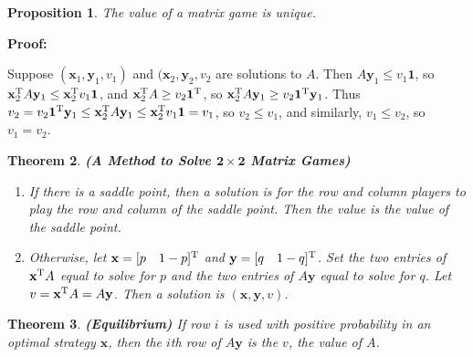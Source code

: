 \documentclass{article}
\theoremstyle{colontheorem}
\newtheorem{theorem}{Theorem}[section]
\newtheorem{proposition}[theorem]{Proposition}
\newcommand{\T}{^\textnormal{T}}
\newenvironment{Theorem}
{
	\begin{mdframed}[backgroundcolor=TheoremOrange!10]
	\begin{theorem}
}
{
	\end{theorem}
	\end{mdframed}
	
	\vspace{.15in}
}
\newenvironment{Proposition}
{
	\begin{mdframed}[backgroundcolor=TheoremOrange!10]
	\begin{proposition}
}
{
	\end{proposition}
	\end{mdframed}
	
	\vspace{.15in}
}
\newenvironment{Proof}
{
	\vspace{-.3in}
	
	\begin{mdframed}[backgroundcolor=ProofPurple!10]
	\textbf{Proof:}%
}
{
	\end{mdframed}
	
	\vspace{.15in}
}
\begin{document}
\begin{Proposition}
	
	The value of a matrix game is unique.
	
\end{Proposition}



\begin{Proof}
	Suppose $(\mathbf{x}_1, \mathbf{y}_1, v_1)$ and $(\mathbf{x}_2, \mathbf{y}_2, v_2$ are solutions to $A$. Then $A \mathbf{y}_1 \leq v_1 \mathbf{1}$, so $\mathbf{x}_2\T A \mathbf{y}_1 \leq \mathbf{x}_2\T v_1 \mathbf{1}$, and $\mathbf{x}_2\T A \geq v_2 \mathbf{1}\T$, so $\mathbf{x}_2\T A \mathbf{y}_1 \geq v_2 \mathbf{1}\T \mathbf{y}_1$. Thus $v_2 = v_2 \mathbf{1}\T \mathbf{y}_1 \leq \mathbf{x}_2\T A \mathbf{y}_1 \leq \mathbf{x}_2\T v_1 \mathbf{1} = v_1$, so $v_2 \leq v_1$, and similarly, $v_1 \leq v_2$, so $v_1 = v_2$.
	
\end{Proof}



\begin{Theorem}
	
	\textbf{(A Method to Solve $\mathbf{2 \times 2}$ Matrix Games)}
	
	\begin{enumerate}
		
		\item If there is a saddle point, then a solution is for the row and column players to play the row and column of the saddle point. Then the value is the value of the saddle point.
		
		\item Otherwise, let $\mathbf{x} = [p\ \ \ 1-p]\T$ and $\mathbf{y} = [q\ \ \ 1-q]\T$. Set the two entries of $\mathbf{x}\T A$ equal to solve for $p$ and the two entries of $A \mathbf{y}$ equal to solve for $q$. Let $v = \mathbf{x}\T A = A \mathbf{y}$. Then a solution is $(\mathbf{x}, \mathbf{y}, v)$.
		
	\end{enumerate}
	
\end{Theorem}



\begin{Theorem}
	
	\textbf{(Equilibrium)} If row $i$ is used with positive probability in an optimal strategy $\mathbf{x}$, then the $i$th row of $A\mathbf{y}$ is the $v$, the value of $A$.
	
\end{Theorem}
\end{document}

